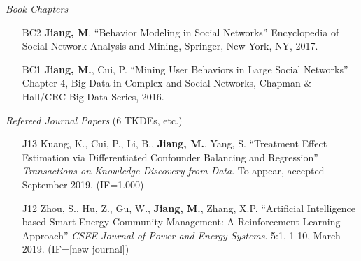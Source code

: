 \documentclass[10pt]{article}
\newenvironment{myindentpar}[1]%
{\begin{list}{}%
         {\setlength{\leftmargin}{#1}}%
         \item[]%
}
{\end{list}}
\newcounter{list}
\begin{document}
\begin{myindentpar}{0.00cm}

\hspace{-0.25cm}\emph{Book Chapters}

\begin{enumerate}[leftmargin=.5cm]

\item[BC2] \textbf{Jiang, M}. ``Behavior Modeling in Social Networks'' Encyclopedia of Social Network Analysis and Mining, Springer, New York, NY, 2017.
		
\item[BC1] \textbf{Jiang, M.}, Cui, P. ``Mining User Behaviors in Large Social Networks'' Chapter 4, Big Data in Complex and Social Networks, Chapman \& Hall/CRC Big Data Series, 2016.

\vspace{-0.1cm}

\end{enumerate}

\hspace{-0.25cm}\emph{Refereed Journal Papers} (6 TKDEs, etc.)

\begin{enumerate}[leftmargin=.5cm]

\item[J13] Kuang, K., Cui, P., Li, B., \textbf{Jiang, M.}, Yang, S. ``Treatment Effect Estimation via Differentiated Confounder Balancing and Regression'' \textit{Transactions on Knowledge Discovery from Data}. To appear, accepted September 2019. (IF=1.000)

\vspace{-0.1cm}

\item[J12] Zhou, S., Hu, Z., Gu, W., \textbf{Jiang, M.}, Zhang, X.P. ``Artificial Intelligence based Smart Energy Community Management: A Reinforcement Learning Approach'' \textit{CSEE Journal of Power and Energy Systems}. 5:1, 1-10, March 2019. (IF=[new journal])

\vspace{-0.1cm}


\end{enumerate}
\end{myindentpar}
\end{document}

